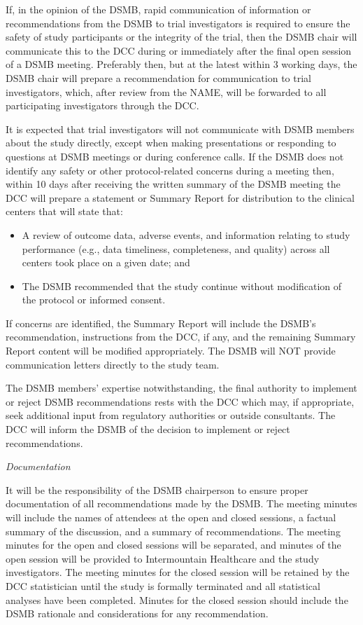 \documentclass[12pt]{article}
\begin{document}
If, in the opinion of the DSMB, rapid communication of information or 
recommendations from the DSMB to trial investigators is required to ensure 
the safety of study participants or the integrity of the trial, then the 
DSMB chair will communicate this to the DCC during or immediately after the 
final open session of a DSMB meeting. Preferably then, but at the latest 
within 3 working days, the DSMB chair will prepare a recommendation for 
communication to trial investigators, which, after review from the NAME, 
will be forwarded to all participating investigators through the DCC. 

It is expected that trial investigators will not communicate with DSMB 
members about the study directly, except when making presentations or 
responding to questions at DSMB meetings or during conference calls.
If the DSMB does not identify any safety or other protocol-related concerns 
during a meeting then, within 10 days after receiving the written summary of 
the DSMB meeting the DCC will prepare a statement or Summary Report for 
distribution to the clinical centers that will state that: 
\begin{itemize}
\item A review of outcome data, adverse events, and information relating to study performance (e.g., data timeliness, completeness, and quality) across all centers took place on a given date; and
\item The DSMB recommended that the study continue without modification of the protocol or informed consent.
\end{itemize}


If concerns are identified, the Summary Report will include the DSMB’s 
recommendation, instructions from the DCC, if any, and the remaining Summary 
Report content will be modified appropriately.  The DSMB will NOT provide 
communication letters directly to the study team.  

The DSMB members’ expertise notwithstanding, the final authority to 
implement or reject DSMB recommendations rests with the DCC which may, if 
appropriate, seek additional input from regulatory authorities or outside 
consultants. The DCC will inform the DSMB of the decision to implement or 
reject recommendations. 

\vspace{0.4cm}
\noindent \textit{Documentation}

It will be the responsibility of the DSMB chairperson to ensure proper 
documentation of all recommendations made by the DSMB. The meeting minutes 
will include the names of attendees at the open and closed sessions, a 
factual summary of the discussion, and a summary of recommendations. The 
meeting minutes for the open and closed sessions will be separated, and 
minutes of the open session will be provided to Intermountain Healthcare and 
the study investigators. The meeting minutes for the closed session will be 
retained by the DCC statistician until the study is formally terminated and 
all statistical analyses have been completed.  Minutes for the closed 
session should include the DSMB rationale and considerations for any 
recommendation.
\end{document}
